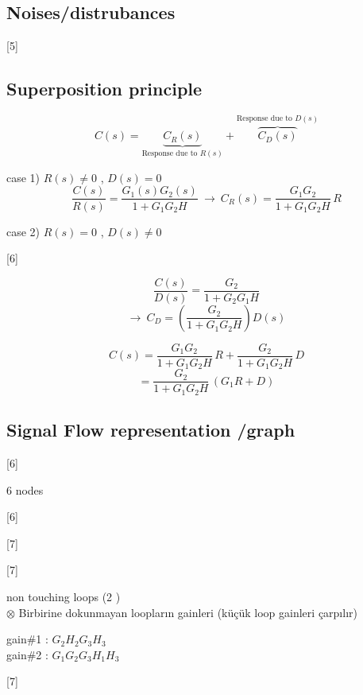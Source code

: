 \documentclass[11pt,a4paper]{article}
\begin{document}
\subsection{Noises/distrubances}
[5]

\subsection{Superposition principle}
\[ C(s) = \underbrace{C_R(s)}_{\text{Response due to } R(s)} + \overbrace{C_D(s)}^{\text{Response due to } D(s)} \]

\noindent case 1) \quad $R(s)\neq 0$ , $D(s)=0$
\[ \frac{C(s)}{R(s)} = \frac{G_1(s)G_2(s)}{1+G_1G_2H} \ \rightarrow\ C_R(s) = \frac{G_1G_2}{1+G_1G_2H}\,R \]

\noindent case 2) \quad $R(s)=0$ , $D(s)\neq 0$


[6]

\[ \frac{C(s)}{D(s)} = \frac{G_2}{1+G_2G_1H} \]
\[ \rightarrow\ C_D = \left(\frac{G_2}{1+G_1G_2H}\right)D(s) \]

\[ C(s) = \frac{G_1G_2}{1+G_1G_2H}\,R + \frac{G_2}{1+G_1G_2H}\,D \]
\[ = \frac{G_2}{1+G_1G_2H}\,(G_1R+D) \]

\subsection{Signal Flow representation /graph}
[6]

\noindent \textcolor{turuncukalem}{6 nodes}

[6]


[7]

[7]

\noindent \textcolor{kirmizikalem}{non touching loops (2 )}\\
$\otimes$ Birbirine dokunmayan loopların gainleri (küçük loop gainleri çarpılır)

\noindent gain\#1 : $G_2 H_2 G_3 H_3$\\
gain\#2 : $G_1 G_2 G_3 H_1 H_3$

[7]
\end{document}
